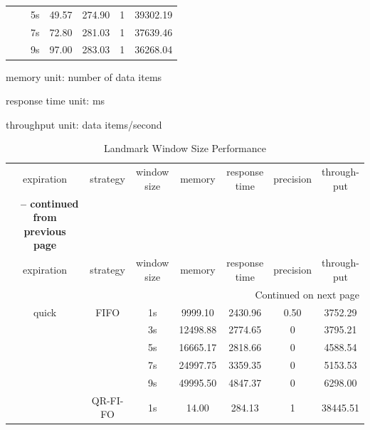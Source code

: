 \begin{center}
\begin{longtable}{|c||c||c|c|c|c|c|}
			   &          & 5s & 49.57 & 274.90 & 1 & 39302.19\\ \cline{3-7}
			   &          & 7s & 72.80 & 281.03 & 1 & 37639.46\\ \cline{3-7}
			   &          & 9s & 97.00 & 283.03 & 1 & 36268.04 \\              
\end{longtable}
    \begin{tablenotes}
 		\item memory unit: number of data items
 		\item response time unit: ms
 		\item throughput unit: data items/second
    \end{tablenotes}
\end{center}

\begin{center}
	\begin{longtable}{|c||c||c|c|c|c|c|}
	\caption[Landmark Window Size Performance]{Landmark Window Size Performance} \label{tab:6-lwsp} \\
	\hline expiration & strategy & \makecell{window \\ size} & memory & \makecell{response \\ time} & precision & \makecell{through-\\put} \\ \hhline{|=#=#=|=|=|=|=|}
	\endfirsthead
	\multicolumn{7}{c} {{\bfseries \tablename\ \thetable{} -- continued from previous page}} \\
	\hline expiration & strategy & \makecell{window \\ size} & memory & \makecell{response \\ time} & precision & \makecell{through-\\put} \\ \hline 
	\endhead
	\hline \multicolumn{7}{|r|}{{Continued on next page}} \\ \hline
	\endfoot
	\hline
	\endlastfoot    
        quick & FIFO & 1s & 9999.10 & 2430.96 & 0.50 & 3752.29 \\ \cline{3-7}
			  &	     & 3s & 12498.88 & 2774.65 & 0 & 3795.21 \\ \cline{3-7}
			  &      & 5s & 16665.17 & 2818.66 & 0 & 4588.54 \\ \cline{3-7}
			  &      & 7s & 24997.75 & 3359.35 & 0 & 5153.53 \\ \cline{3-7}
			  &      & 9s & 49995.50 & 4847.37 & 0 & 6298.00 \\ \cline{2-7}
			  & QR-FI-FO & 1s & 14.00 & 284.13 & 1& 38445.51\\ \cline{3-7}

\end{longtable}
\end{center}
